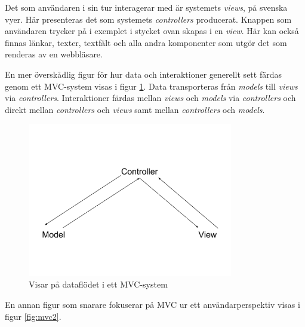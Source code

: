 Det som användaren i sin tur interagerar med är systemets \textit{views}, på svenska vyer. Här presenteras det som systemets \textit{controllers} producerat. Knappen som användaren trycker på i exemplet i stycket ovan skapas i en \textit{view}. Här kan också finnas länkar, texter, textfält och alla andra komponenter som utgör det som renderas av en webbläsare.

En mer överskådlig figur för hur data och interaktioner generellt sett färdas genom ett MVC-system visas i figur \ref{fig:mvc1}. Data transporteras från \textit{models} till \textit{views} via \textit{controllers}. Interaktioner färdas mellan \textit{views} och \textit{models} via \textit{controllers} och direkt mellan \textit{controllers} och \textit{views} samt mellan \textit{controllers} och \textit{models}.

\begin{figure}[!H]
\centering
\includegraphics[width=0.8\textwidth]{figures/mvc1.png}
\caption{Visar på dataflödet i ett MVC-system}
\label{fig:mvc1}
\end{figure}

En annan figur som snarare fokuserar på MVC ur ett användarperspektiv visas i figur \ref{fig:mvc2}.

